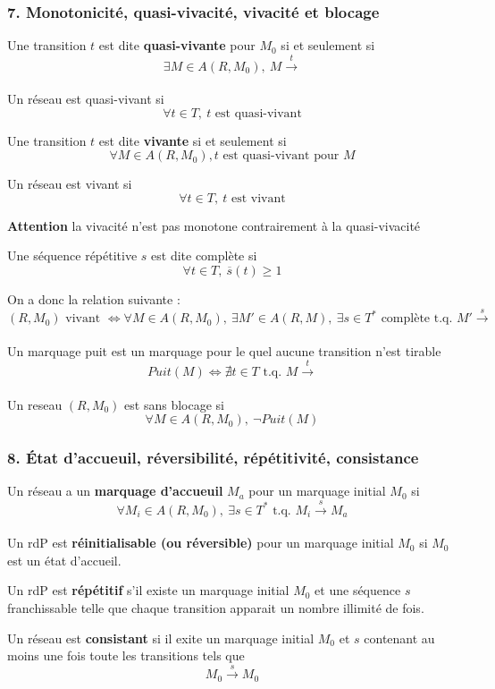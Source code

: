 \documentclass[12pt,a4paper,oneside]{article}
\begin{document}
	\subsubsection*{7. Monotonicité, quasi-vivacité, vivacité et blocage}

		Une transition $t$ est dite \textbf{quasi-vivante} pour $M_0$ si et seulement si
		$$\exists M \in A(R,M_0),\ M \xrightarrow[]{t}$$

		Un réseau est quasi-vivant si
		$$\forall t \in T,\ t \textrm{ est quasi-vivant}$$

		Une transition $t$ est dite \textbf{vivante} si et seulement si
		$$\forall M \in A(R,M_0), t \textrm{ est quasi-vivant pour } M$$

		Un réseau est vivant si
		$$\forall t \in T,\ t \textrm{ est vivant}$$

		\textbf{Attention} la vivacité n'est pas monotone contrairement à la quasi-vivacité

		Une séquence répétitive $s$ est dite complète si
		$$\forall t \in T,\ \overline{s}(t) \geq 1$$

		On a donc la relation suivante :
		$$(R, M_0) \textrm{ vivant } \iff
		\forall M \in A(R,M_0),\
		\exists M' \in A(R,M),\
		\exists s \in T^* \textrm{ complète t.q. }
		M' \xrightarrow[]{s}$$

		Un marquage puit est un marquage pour le quel aucune transition n'est tirable
		$$Puit(M) \iff \nexists t \in T \textrm{ t.q. } M \xrightarrow[]{t}$$

		Un reseau $(R,M_0)$ est sans blocage si
		$$\forall M \in A(R,M_0),\ \neg Puit(M)$$

	\subsubsection*{8. État d'accueuil, réversibilité, répétitivité, consistance}

		Un réseau a un \textbf{marquage d'accueuil} $M_a$ pour un marquage initial $M_0$ si
		$$\forall M_i \in A(R,M_0),\ \exists s \in T^* \textrm{ t.q. } M_i \xrightarrow[]{s} M_a$$

		Un rdP est \textbf{réinitialisable (ou réversible)} pour un marquage initial $M_0$ si $M_0$ est un état d'accueil.

		Un rdP est \textbf{répétitif} s'il existe un marquage initial $M_0$ et une séquence $s$ franchissable telle que chaque transition apparait un nombre illimité de fois.

		Un réseau est \textbf{consistant} si il exite un marquage initial $M_0$ et $s$ contenant au moins une fois toute les transitions tels que
		$$M_0 \xrightarrow[]{s} M_0$$
\end{document}

